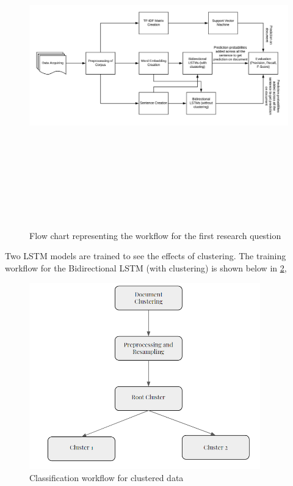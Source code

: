 \begin{figure}[!ht]
    \centering
    \includegraphics[width=15cm, height=14cm,keepaspectratio]{pics/flowforQuestion1.jpeg}
    \caption{Flow chart representing the workflow for the first research question }
    \label{fig:FlowResearchQuestion1}
\end{figure}

Two LSTM models are trained to see the effects of clustering. The training workflow for the Bidirectional LSTM (with clustering) is shown below in \ref{fig:clusterFlowClassification},

\begin{figure}[!ht]
    \centering
    \includegraphics[width=10cm,keepaspectratio]{pics/clusterClassificationFlow.png}
    \caption{Classification workflow for clustered data}
    \label{fig:clusterFlowClassification}
\end{figure}

